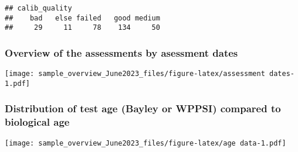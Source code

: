 \documentclass[
]{article}
\begin{document}
\begin{verbatim}
## calib_quality
##    bad   else failed   good medium 
##     29     11     78    134     50
\end{verbatim}

\hypertarget{overview-of-the-assessments-by-asessment-dates}{%
\subsubsection{Overview of the assessments by asessment
dates}\label{overview-of-the-assessments-by-asessment-dates}}

\texttt{[image: sample\_overview\_June2023\_files/figure-latex/assessment dates-1.pdf]}

\hypertarget{distribution-of-test-age-bayley-or-wppsi-compared-to-biological-age}{%
\subsubsection{Distribution of test age (Bayley or WPPSI) compared to
biological
age}\label{distribution-of-test-age-bayley-or-wppsi-compared-to-biological-age}}

\texttt{[image: sample\_overview\_June2023\_files/figure-latex/age data-1.pdf]}
\end{document}
